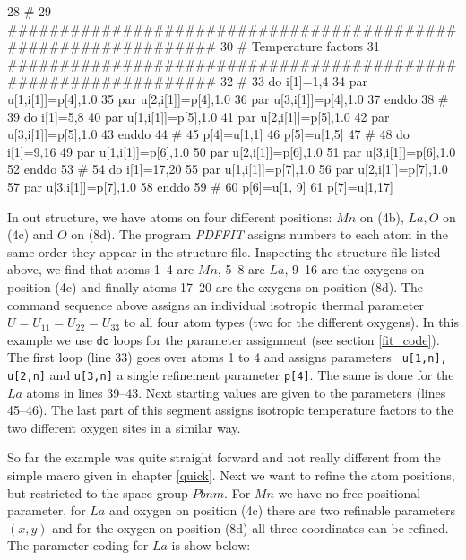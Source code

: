 \footnotesize
\begin{MacVerbatim}
     28 #
     29 ###############################################################
     30 # Temperature factors
     31 ###############################################################
     32 #
     33 do i[1]=1,4
     34   par u[1,i[1]]=p[4],1.0
     35   par u[2,i[1]]=p[4],1.0
     36   par u[3,i[1]]=p[4],1.0
     37 enddo
     38 #
     39 do i[1]=5,8
     40   par u[1,i[1]]=p[5],1.0
     41   par u[2,i[1]]=p[5],1.0
     42   par u[3,i[1]]=p[5],1.0
     43 enddo
     44 #
     45 p[4]=u[1,1]
     46 p[5]=u[1,5]
     47 #
     48 do i[1]=9,16
     49   par u[1,i[1]]=p[6],1.0
     50   par u[2,i[1]]=p[6],1.0
     51   par u[3,i[1]]=p[6],1.0
     52 enddo
     53 #
     54 do i[1]=17,20
     55   par u[1,i[1]]=p[7],1.0
     56   par u[2,i[1]]=p[7],1.0
     57   par u[3,i[1]]=p[7],1.0
     58 enddo
     59 #
     60 p[6]=u[1, 9]
     61 p[7]=u[1,17]
\end{MacVerbatim}
\normalsize

\noindent In out structure, we have atoms on four different
positions: $Mn$ on (4b), $La, O$ on (4c) and $O$ on (8d). The
program {\it PDFFIT} assigns numbers to each atom in the same
order they appear in the structure file. Inspecting the structure
file listed above, we find that atoms 1--4 are $Mn$, 5--8 are
$La$, 9--16 are the oxygens on position (4c) and finally atoms
17--20 are the oxygens on position (8d). The command sequence
above assigns an individual isotropic thermal parameter
$U=U_{11}=U_{22}=U_{33}$ to all four atom types (two for the
different oxygens). In this example we use {\tt do} loops for the
parameter assignment (see section \ref{fit_code}). The first loop
(line 33) goes over atoms 1 to 4 and assigns parameters {\tt
u[1,n], u[2,n]} and {\tt u[3,n]} a single refinement parameter
{\tt p[4]}. The same is done for the $La$ atoms in lines 39--43.
Next starting values are given to the parameters (lines 45--46).
The last part of this segment assigns isotropic temperature
factors to the two different oxygen sites in a similar way. \par

So far the example was quite straight forward and not really different
from the simple macro given in chapter \ref{quick}. Next we want to
refine the atom positions, but restricted to the space group $Pbnm$.
For $Mn$ we have no free positional parameter, for $La$ and oxygen on
position (4c) there are two refinable parameters $(x,y)$ and for
the oxygen on position (8d) all three coordinates can be refined.
The parameter coding for $La$ is show below:

